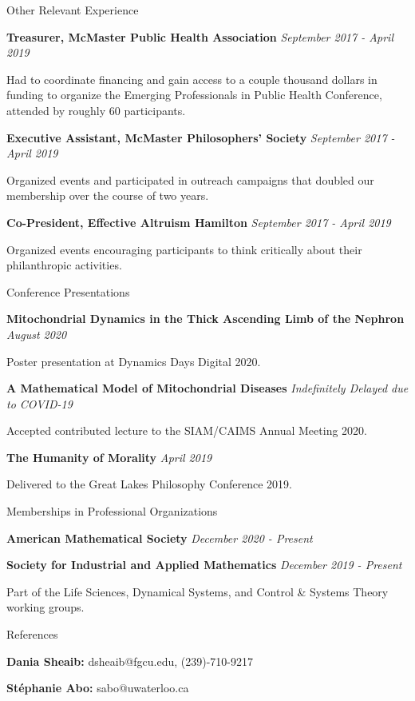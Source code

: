 \documentclass{resume} %
\begin{document}
\begin{rSection}{Other Relevant Experience}

{\bf Treasurer, McMaster Public Health Association} \hfill {\em September 2017 - April 2019}

Had to coordinate financing and gain access to a couple thousand dollars in funding to organize the Emerging Professionals in Public Health Conference, attended by roughly 60 participants.

{\bf Executive Assistant, McMaster Philosophers' Society} \hfill {\em September 2017 - April 2019}

Organized events and participated in outreach campaigns that doubled our membership over the course of two years.

{\bf Co-President, Effective Altruism Hamilton} \hfill {\em September 2017 - April 2019}

Organized events encouraging participants to think critically about their philanthropic activities.

\end{rSection}

\begin{rSection}{Conference Presentations}

{\bf Mitochondrial Dynamics in the Thick Ascending Limb of the Nephron} \hfill {\em August 2020}

Poster presentation at Dynamics Days Digital 2020.

{\bf A Mathematical Model of Mitochondrial Diseases} \hfill {\em Indefinitely Delayed due to COVID-19}

Accepted contributed lecture to the SIAM/CAIMS Annual Meeting 2020.

{\bf The Humanity of Morality} \hfill {\em April 2019}

Delivered to the Great Lakes Philosophy Conference 2019.

\end{rSection}

%
%
%
%

\begin{rSection}{Memberships in Professional Organizations}

{\bf American Mathematical Society} \hfill {\em December 2020 - Present}

{\bf Society for Industrial and Applied Mathematics} \hfill {\em December 2019 - Present}

Part of the Life Sciences, Dynamical Systems, and Control \& Systems Theory working groups.

\end{rSection}

\begin{rSection}{References}

{\bf Dania Sheaib:} dsheaib@fgcu.edu, (239)-710-9217

{\bf St\'{e}phanie Abo:} sabo@uwaterloo.ca

\end{rSection}
\end{document}
